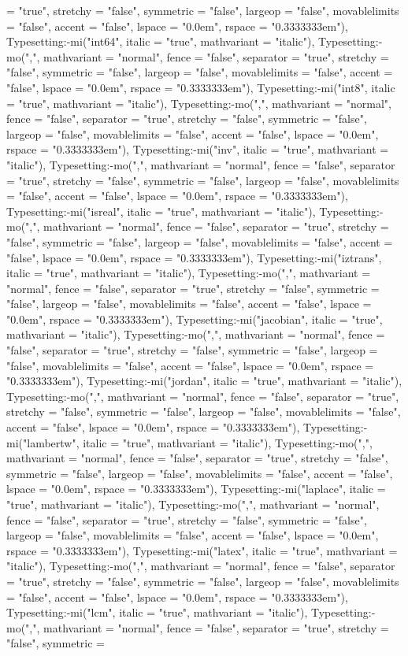 \documentclass{article}
\begin{document}
{{{\begin{maplegroup}
\begin{maplelatex}
= "true", stretchy = "false", symmetric = "false", largeop = "false", movablelimits = "false", accent = "false", lspace = "0.0em", rspace = "0.3333333em"), Typesetting:-mi("int64", italic = "true", mathvariant = "italic"), Typesetting:-mo(",", mathvariant = "normal", fence = "false", separator = "true", stretchy = "false", symmetric = "false", largeop = "false", movablelimits = "false", accent = "false", lspace = "0.0em", rspace = "0.3333333em"), Typesetting:-mi("int8", italic = "true", mathvariant = "italic"), Typesetting:-mo(",", mathvariant = "normal", fence = "false", separator = "true", stretchy = "false", symmetric = "false", largeop = "false", movablelimits = "false", accent = "false", lspace = "0.0em", rspace = "0.3333333em"), Typesetting:-mi("inv", italic = "true", mathvariant = "italic"), Typesetting:-mo(",", mathvariant = "normal", fence = "false", separator = "true", stretchy = "false", symmetric = "false", largeop = "false", movablelimits = "false", accent = "false", lspace = "0.0em", rspace = "0.3333333em"), Typesetting:-mi("isreal", italic = "true", mathvariant = "italic"), Typesetting:-mo(",", mathvariant = "normal", fence = "false", separator = "true", stretchy = "false", symmetric = "false", largeop = "false", movablelimits = "false", accent = "false", lspace = "0.0em", rspace = "0.3333333em"), Typesetting:-mi("iztrans", italic = "true", mathvariant = "italic"), Typesetting:-mo(",", mathvariant = "normal", fence = "false", separator = "true", stretchy = "false", symmetric = "false", largeop = "false", movablelimits = "false", accent = "false", lspace = "0.0em", rspace = "0.3333333em"), Typesetting:-mi("jacobian", italic = "true", mathvariant = "italic"), Typesetting:-mo(",", mathvariant = "normal", fence = "false", separator = "true", stretchy = "false", symmetric = "false", largeop = "false", movablelimits = "false", accent = "false", lspace = "0.0em", rspace = "0.3333333em"), Typesetting:-mi("jordan", italic = "true", mathvariant = "italic"), Typesetting:-mo(",", mathvariant = "normal", fence = "false", separator = "true", stretchy = "false", symmetric = "false", largeop = "false", movablelimits = "false", accent = "false", lspace = "0.0em", rspace = "0.3333333em"), Typesetting:-mi("lambertw", italic = "true", mathvariant = "italic"), Typesetting:-mo(",", mathvariant = "normal", fence = "false", separator = "true", stretchy = "false", symmetric = "false", largeop = "false", movablelimits = "false", accent = "false", lspace = "0.0em", rspace = "0.3333333em"), Typesetting:-mi("laplace", italic = "true", mathvariant = "italic"), Typesetting:-mo(",", mathvariant = "normal", fence = "false", separator = "true", stretchy = "false", symmetric = "false", largeop = "false", movablelimits = "false", accent = "false", lspace = "0.0em", rspace = "0.3333333em"), Typesetting:-mi("latex", italic = "true", mathvariant = "italic"), Typesetting:-mo(",", mathvariant = "normal", fence = "false", separator = "true", stretchy = "false", symmetric = "false", largeop = "false", movablelimits = "false", accent = "false", lspace = "0.0em", rspace = "0.3333333em"), Typesetting:-mi("lcm", italic = "true", mathvariant = "italic"), Typesetting:-mo(",", mathvariant = "normal", fence = "false", separator = "true", stretchy = "false", symmetric = 
\end{maplelatex}
\end{maplegroup}}}}
\end{document}
